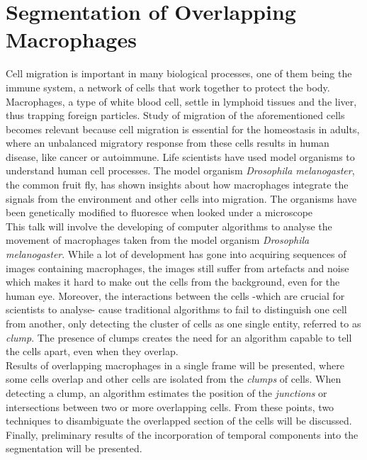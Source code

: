   \section*{Segmentation of Overlapping Macrophages}
%
Cell migration is important in many biological processes, one of them
being the immune system, a network of cells that work together to protect the
body. Macrophages, a type of white blood cell, settle in lymphoid tissues and
the liver, thus trapping foreign particles\cite{Martinez2008}.
Study of migration of the aforementioned cells
becomes relevant because cell migration is essential for the
homeostasis in adults\cite{pocha2014}, where
an unbalanced migratory response from these cells results in human disease,
like cancer or autoimmune.
Life scientists have used model organisms to understand human cell processes.
The model organism \emph{Drosophila melanogaster}, the common fruit fly,
has shown insights about how macrophages integrate the signals
from the environment and other cells into migration\cite{wood2017}.
The organisms have been genetically modified to fluoresce
when looked under a microscope\cite{Stramer2010}\medskip\\
%
This talk will involve the developing of computer algorithms to analyse the
movement of macrophages taken from the model organism
\emph{Drosophila melanogaster}. While a lot of development
has gone into acquiring sequences of images containing macrophages,
the images still suffer from artefacts and noise which makes it hard to
make out the cells from the background, even for the human eye.
Moreover, the interactions between the cells -which are crucial for scientists
to analyse- cause traditional algorithms\cite{Henry2013,lu2015,Caselles}
to fail to distinguish one cell from
another, only detecting the cluster of cells as one single entity, referred to
as \emph{clump}. The presence of clumps
creates the need for an algorithm capable to tell the cells apart, even when
they overlap.\medskip\\
%
Results of overlapping macrophages in a single frame will be
presented, where some cells overlap and other cells are
isolated from the \emph{clumps} of cells. When detecting a clump,
an algorithm estimates the position of the \emph{junctions} or intersections
between two or more overlapping cells. From these points, two techniques
to disambiguate the overlapped section of the cells will be discussed.
Finally, preliminary results of the incorporation of temporal components
into the segmentation will be presented. 
